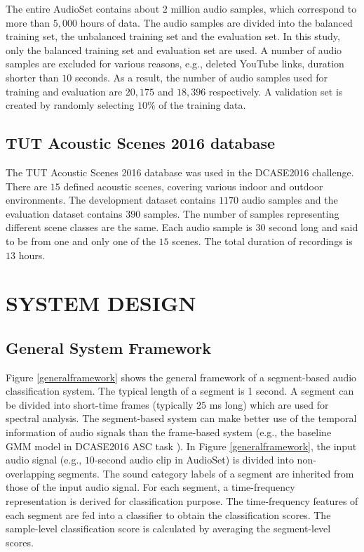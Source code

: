 \documentclass{article}
\begin{document}
The entire AudioSet contains about $2$ million audio samples, which correspond to more than $5,000$ hours of data. The audio samples are divided into the balanced training set, the unbalanced training set and the evaluation set. In this study, only the balanced training set and evaluation set are used. A number of audio samples are excluded for various reasons, e.g., deleted YouTube links, duration shorter than $10$ seconds. As a result, the number of audio samples used for training and evaluation are $20,175$ and $18,396$ respectively. A validation set is created by randomly selecting $10\%$ of the training data.


\subsection{TUT Acoustic Scenes 2016 database}
\label{ssec:tutdatabase}

The TUT Acoustic Scenes 2016 database \cite{mesaros2016tut} was used in the DCASE2016 challenge. There are $15$ defined acoustic scenes, covering various indoor and outdoor environments. The development dataset contains $1170$ audio samples and the evaluation dataset contains $390$ samples. The number of samples representing different scene classes are the same. Each audio sample is $30$ second long and said to be from one and only one of the $15$ scenes. The total duration of recordings is $13$ hours.




\section{SYSTEM DESIGN}
\label{sec:systemdesign}

\subsection{General System Framework}
\label{ssec:generalframework}

Figure \ref{generalframework} shows the general framework of a segment-based audio classification system. The typical length of a segment is 1 second. A segment can be divided into short-time frames (typically $25$ ms long) which are used for spectral analysis. The segment-based system can make better use of the temporal information of audio signals than the frame-based system (e.g., the baseline GMM model in DCASE2016 ASC task \cite{Heittola2016}). In Figure \ref{generalframework}, the input audio signal (e.g., $10$-second audio clip in AudioSet) is divided into non-overlapping segments. The sound category labels of a segment are inherited from those of the input audio signal. For each segment, a time-frequency representation is derived for classification purpose. The time-frequency features of each segment are fed into a classifier to obtain the classification scores. The sample-level classification score is calculated by averaging the segment-level scores.
\end{document}
